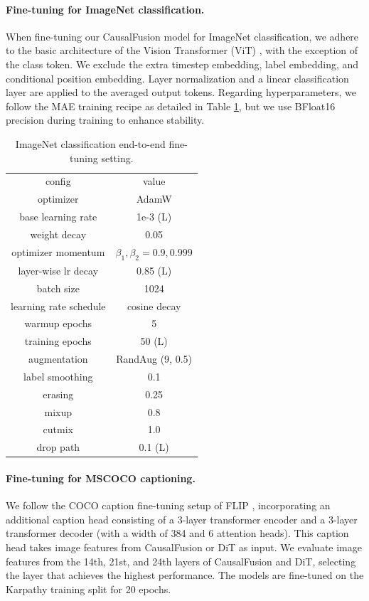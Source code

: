 \paragraph{Fine-tuning for ImageNet classification.}
\label{appendix:in1k}
When fine-tuning our CausalFusion model for ImageNet classification, we adhere to the basic architecture of the Vision Transformer (ViT) \cite{vit}, with the exception of the class token. 
We exclude the extra timestep embedding, label embedding, and conditional position embedding. 
Layer normalization and a linear classification layer are applied to the averaged output tokens. 
Regarding hyperparameters, we follow the MAE training recipe \cite{he2022masked} as detailed in Table \ref{tab:impl_finetune}, but we use BFloat16 precision during training to enhance stability.

\begin{table}[t]
    \footnotesize
    \begin{tabular}{c|c}
        config & value \\
        \shline
        optimizer & AdamW \\
        base learning rate & 1e-3 (L) \\
        weight decay & 0.05 \\
        optimizer momentum & $\beta_1, \beta_2{=}0.9, 0.999$ \\
        layer-wise lr decay \cite{electra,beit} & 0.85 (L) \\
        batch size & 1024 \\
        learning rate schedule & cosine decay \\
        warmup epochs & 5 \\
        training epochs & 50 (L) \\
        augmentation & RandAug (9, 0.5) \cite{randaugment} \\
        label smoothing \cite{label_smooth} & 0.1 \\
        erasing \cite{erasing} & 0.25 \\
        mixup \cite{mixup} & 0.8 \\
        cutmix \cite{cutmix} & 1.0 \\
        drop path \cite{droppath} & 0.1 (L) \\
    \end{tabular}
    \caption{{ImageNet classification end-to-end fine-tuning setting.}}
    \label{tab:impl_finetune}
\end{table}

\paragraph{Fine-tuning for MSCOCO captioning.}
We follow the COCO caption fine-tuning setup of FLIP \cite{flip}, incorporating an additional caption head consisting of a 3-layer transformer encoder and a 3-layer transformer decoder (with a width of 384 and 6 attention heads). This caption head takes image features from CausalFusion or DiT as input.
We evaluate image features from the 14th, 21st, and 24th layers of CausalFusion and DiT, selecting the layer that achieves the highest performance.
The models are fine-tuned on the Karpathy training split for 20 epochs.


